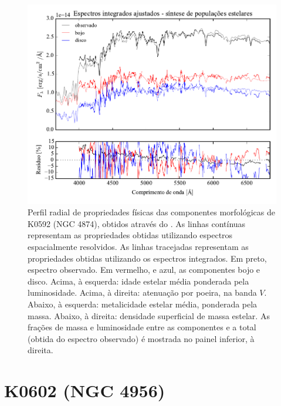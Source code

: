 \begin{figure}
	\includegraphics[page=6]{figuras/sample006a_synthesis}
	\caption[Propriedades físicas das componentes morfológicas de K0592 (NGC 4874)]
	{Perfil radial de propriedades físicas das componentes morfológicas de
	K0592 (NGC 4874), obtidos através do \starlight. As linhas contínuas
	representam as propriedades obtidas utilizando espectros espacialmente
	resolvidos. As linhas tracejadas representam as propriedades obtidas utilizando
	os espectros integrados. Em preto, espectro observado. Em vermelho, e azul, as
	componentes bojo e disco. Acima, à esquerda: idade estelar média ponderada pela
	luminosidade. Acima, à direita: atenuação por poeira, na banda $V$. Abaixo, à
	esquerda: metalicidade estelar média, ponderada pela massa. Abaixo, à direita:
	densidade superficial de massa estelar. As frações de massa e luminosidade
	entre as componentes e a total (obtida do espectro observado) é mostrada no
	painel inferior, à direita.}
	\label{fig:decompSinteseRadprof:K0592}
\end{figure}


\section{K0602 (NGC 4956)}
\label{apendice:Decomp:K0602}

